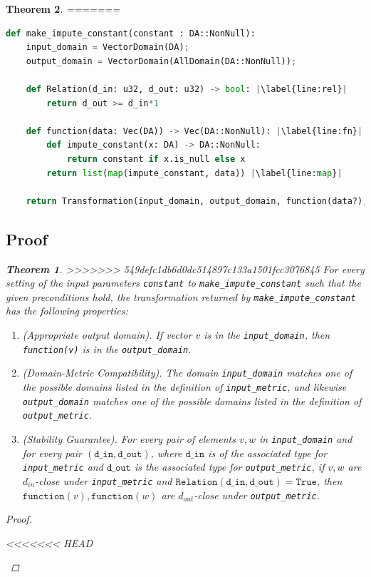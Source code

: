 \documentclass[11pt,a4paper]{article}
\newtheorem{theorem}{Theorem}[section]
\newcommand{\grace}[1]{{ {\color{purple}{(grace)~#1}}}}
\newcommand{\din}{\texttt{d\_in}}
\newcommand{\dout}{\texttt{d\_out}}
\newcommand{\Relation}{\texttt{Relation}}
\newcommand{\True}{\texttt{True}}
\newcommand{\function}{\texttt{function}}
\begin{document}
\begin{theorem}
=======
\grace{Not sure if I need to include the error check for whether the constant is nonnull in line 69 code. Is it already checked? }
\begin{lstlisting}[language=Python,  escapechar=|]
def make_impute_constant(constant : DA::NonNull):
    input_domain = VectorDomain(DA);
    output_domain = VectorDomain(AllDomain(DA::NonNull));
    
    def Relation(d_in: u32, d_out: u32) -> bool: |\label{line:rel}|
        return d_out >= d_in*1

    def function(data: Vec(DA)) -> Vec(DA::NonNull): |\label{line:fn}|
        def impute_constant(x: DA) -> DA::NonNull:
            return constant if x.is_null else x
        return list(map(impute_constant, data)) |\label{line:map}|
        
    return Transformation(input_domain, output_domain, function(data?), input_metric, output_metric, stability_relation=Relation)

\end{lstlisting}

\grace{ Will need to change pseudocode so that it returns the result of a make row by row transformation (which the code does) instead of a Transformation directly. Make sure to ask.}

\subsection{Proof}
\begin{theorem}


>>>>>>> 549defc1db6d0dc514897c133a1501fcc3076845
For every setting of the input parameters \texttt{constant} to \texttt{make\_impute\_constant} such that the given preconditions hold, the transformation returned by \texttt{make\_impute\_constant} has the following properties:
\begin{enumerate}
    \item \textup{(Appropriate output domain).} If vector $v$ is in the \texttt{input\_domain}, then \texttt{function(v)} is in the \texttt{output\_domain}.
    \item \textup{(Domain-Metric Compatibility).} The domain \texttt{input\_domain} matches one of the possible domains listed in the definition of \texttt{input\_metric}, and likewise \texttt{output\_domain} matches one of the possible domains listed in the definition of \texttt{output\_metric}.
    \item \textup{(Stability Guarantee).} For every pair of elements $v, w$ in \texttt{input\_domain} and for every pair $(\din, \dout)$, where $\din$ is of the associated type for \texttt{input\_metric} and $\dout$ is the associated type for \texttt{output\_metric}, if $v,w$ are $d_{in}$-close under \texttt{input\_metric} and $\Relation(\din, \dout) = \True$, then $\function(v), \function(w)$ are $d_{out}$-close under \texttt{output\_metric}.
\end{enumerate}
\end{theorem}
\begin{proof}
\begin{enumerate}
<<<<<<< HEAD


\end{enumerate}
\end{proof}
\end{theorem}
\end{document}
